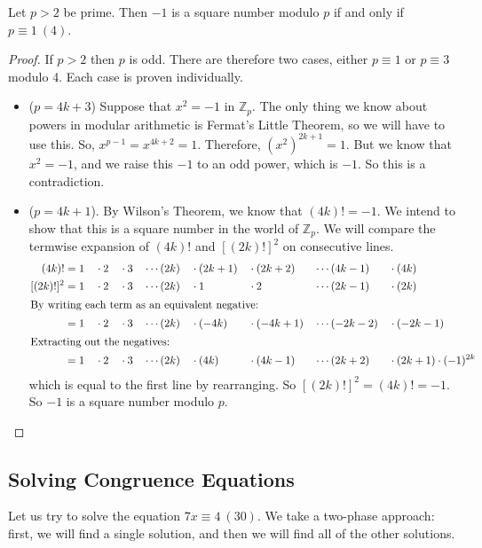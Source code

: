 \documentclass{article}
\begin{document}
	\begin{proposition}
		Let $p>2$ be prime. Then $-1$ is a square number modulo $p$ if and only if $p \equiv 1\ (4)$.
	\end{proposition}
	\begin{proof}
		If $p>2$ then $p$ is odd. There are therefore two cases, either $p \equiv 1$ or $p \equiv 3$ modulo 4. Each case is proven individually.
		\begin{itemize}
			\item ($p = 4k + 3$) Suppose that $x^2 = -1$ in $\mathbb Z_p$. The only thing we know about powers in modular arithmetic is Fermat's Little Theorem, so we will have to use this. So, $x^{p-1} = x^{4k+2} = 1$. Therefore, $(x^2)^{2k+1} = 1$. But we know that $x^2=-1$, and we raise this $-1$ to an odd power, which is $-1$. So this is a contradiction.
			\item ($p = 4k + 1$). By Wilson's Theorem, we know that $(4k)! = -1$. We intend to show that this is a square number in the world of $\mathbb Z_p$. We will compare the termwise expansion of $(4k)!$ and $[(2k)!]^2$ on consecutive lines.
			\begin{alignat*}{9}
				(4k)! &= 1 &&\cdot 2 &&\cdot 3 &&\cdots (2k) &&\cdot (2k+1) &&\cdot (2k+2) &&\cdots (4k-1) &&\cdot (4k) \\
				[(2k)!]^2 &= 1 &&\cdot 2 &&\cdot 3 &&\cdots (2k) &&\cdot 1 &&\cdot 2 &&\cdots (2k-1) &&\cdot (2k) \\
				\intertext{By writing each term as an equivalent negative:}
				&= 1 &&\cdot 2 &&\cdot 3 &&\cdots (2k) &&\cdot (-4k) &&\cdot (-4k+1) &&\cdots (-2k-2) &&\cdot (-2k-1) \\
				\intertext{Extracting out the negatives:}
				&= 1 &&\cdot 2 &&\cdot 3 &&\cdots (2k) &&\cdot (4k) &&\cdot (4k-1) &&\cdots (2k+2) &&\cdot (2k+1) \cdot (-1)^{2k}
			\end{alignat*}
			which is equal to the first line by rearranging. So $[(2k)!]^2 = (4k)! = -1$. So $-1$ is a square number modulo $p$.
		\end{itemize}
	\end{proof}

	\subsection{Solving Congruence Equations}
	Let us try to solve the equation $7x \equiv 4\ (30)$. We take a two-phase approach: first, we will find a single solution, and then we will find all of the other solutions.
	
\end{document}
